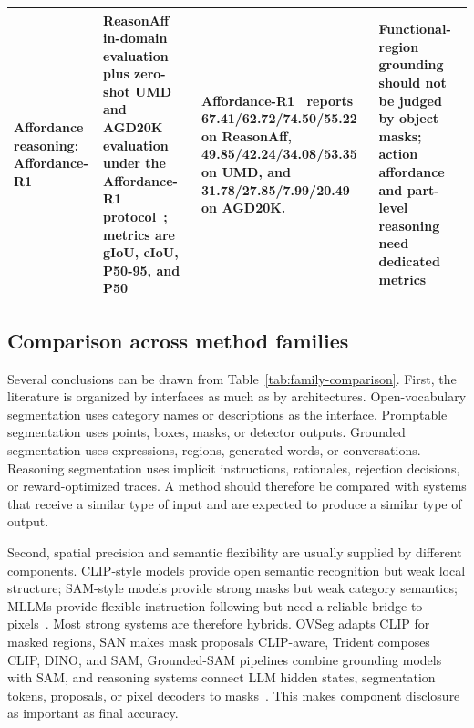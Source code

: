 \begin{table}[t]
\begin{tabularx}{\textwidth}{>{\raggedright\arraybackslash}p{}>{\raggedright\arraybackslash}p{}>{\raggedright\arraybackslash}p{}>{\raggedright\arraybackslash}X}
Affordance reasoning: Affordance-R1~\citep{wangAffordancer1ReinforcementLearning2026} & ReasonAff~\citep{wangAffordancer1ReinforcementLearning2026} in-domain evaluation plus zero-shot UMD and AGD20K evaluation under the Affordance-R1 protocol~\citep{wangAffordancer1ReinforcementLearning2026}; metrics are gIoU, cIoU, P50-95, and P50 & Affordance-R1~\citep{wangAffordancer1ReinforcementLearning2026} reports 67.41/62.72/74.50/55.22 on ReasonAff, 49.85/42.24/34.08/53.35 on UMD, and 31.78/27.85/7.99/20.49 on AGD20K. & Functional-region grounding should not be judged by object masks; action affordance and part-level reasoning need dedicated metrics \\
\bottomrule
\end{tabularx}
\end{table}

\subsection{Comparison across method families}

Several conclusions can be drawn from Table~\ref{tab:family-comparison}. First, the literature is organized by interfaces as much as by architectures. Open-vocabulary segmentation uses category names or descriptions as the interface. Promptable segmentation uses points, boxes, masks, or detector outputs. Grounded segmentation uses expressions, regions, generated words, or conversations. Reasoning segmentation uses implicit instructions, rationales, rejection decisions, or reward-optimized traces. A method should therefore be compared with systems that receive a similar type of input and are expected to produce a similar type of output.

Second, spatial precision and semantic flexibility are usually supplied by different components. CLIP-style models provide open semantic recognition but weak local structure; SAM-style models provide strong masks but weak category semantics; MLLMs provide flexible instruction following but need a reliable bridge to pixels~\citep{radford2021learning,kirillov2023sam,xlaiLisaReasoningSegmentation2024}. Most strong systems are therefore hybrids. OVSeg adapts CLIP for masked regions, SAN makes mask proposals CLIP-aware, Trident composes CLIP, DINO, and SAM, Grounded-SAM pipelines combine grounding models with SAM, and reasoning systems connect LLM hidden states, segmentation tokens, proposals, or pixel decoders to masks~\citep{liang2023ovseg,xu2023san,shiyHarnessingVisionFoundation2025,liu2024groundingdino,renPixellmPixelReasoning2024}. This makes component disclosure as important as final accuracy.

